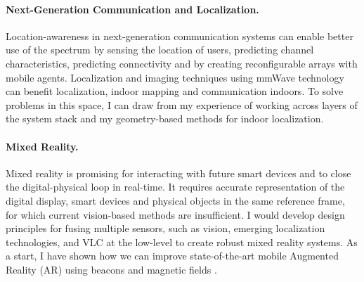 \documentclass[10pt]{article}
\begin{document}
\paragraph{Next-Generation Communication and Localization. }
Location-awareness in next-generation communication systems can enable better use of the
spectrum by sensing the location of users, predicting channel characteristics, predicting connectivity and by creating reconfigurable arrays with mobile agents. 
Localization and imaging techniques using mmWave technology can benefit localization, indoor mapping and communication indoors.  %
To solve problems in this space, I can draw from my experience of working across layers of the system stack and my geometry-based methods for indoor localization. \\


\vspace{-10pt}
\paragraph{Mixed Reality. }
Mixed reality is promising for interacting with future smart devices and to close the digital-physical loop in real-time. It requires accurate representation of the digital display, smart devices and physical objects in the same reference frame, for which current vision-based methods are insufficient.
I would develop design principles for fusing multiple sensors, such as vision, emerging localization technologies, and VLC at the low-level to create robust mixed reality systems. As a start, I have shown how we can improve state-of-the-art mobile Augmented Reality (AR) using beacons and magnetic fields \cite{mobileAR}. %
\end{document}
